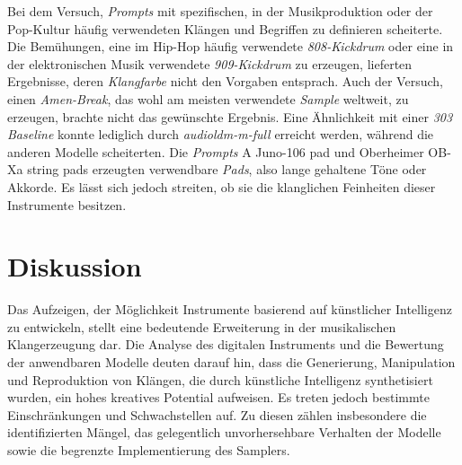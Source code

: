 \documentclass[
  a4paper,  %
  twoside,  %
  bibliography=totoc,
  headsepline,
  cleardoublepage=empty,
  parskip=half,
  draft=false
]{scrbook}
\begin{document}
Bei dem Versuch, \emph{Prompts} mit spezifischen, in der Musikproduktion oder der Pop-Kultur häufig verwendeten Klängen und Begriffen zu definieren scheiterte. Die Bemühungen, eine im Hip-Hop häufig verwendete \emph{808-Kickdrum} oder eine in der elektronischen Musik verwendete \emph{909-Kickdrum} zu erzeugen, lieferten Ergebnisse, deren \emph{Klangfarbe} nicht den Vorgaben entsprach. Auch der Versuch, einen \emph{Amen-Break}, das wohl am meisten verwendete \emph{Sample} weltweit, zu erzeugen, brachte nicht das gewünschte Ergebnis. Eine Ähnlichkeit mit einer \emph{303 Baseline} konnte lediglich durch \emph{audioldm-m-full} erreicht werden, während die anderen Modelle scheiterten. Die \emph{Prompts} \glqq A Juno-106 pad\grqq{} und \glqq Oberheimer OB-Xa string pads\grqq{} erzeugten verwendbare \emph{Pads}, also lange gehaltene Töne oder Akkorde. Es lässt sich jedoch streiten, ob sie die klanglichen Feinheiten dieser Instrumente besitzen. 

\chapter{Diskussion}
Das Aufzeigen, der Möglichkeit Instrumente basierend auf künstlicher Intelligenz zu entwickeln, stellt eine bedeutende Erweiterung in der musikalischen Klangerzeugung dar. Die Analyse des digitalen Instruments und die Bewertung der anwendbaren Modelle deuten darauf hin, dass die Generierung, Manipulation und Reproduktion von Klängen, die durch künstliche Intelligenz synthetisiert wurden, ein hohes kreatives Potential aufweisen. Es treten jedoch bestimmte Einschränkungen und Schwachstellen auf. Zu diesen zählen insbesondere die identifizierten Mängel, das gelegentlich unvorhersehbare Verhalten der Modelle sowie die begrenzte Implementierung des Samplers.
\end{document}
